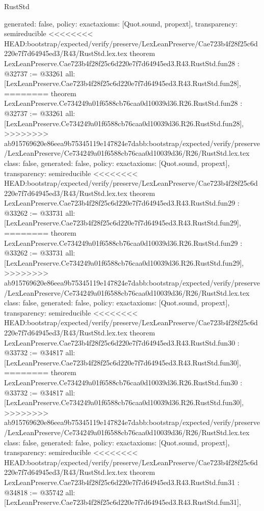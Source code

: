 \begin{lexlean}{RustStd}
\begin{coremodule}
{\begin{coremodule}
{{{{{{{{{{{{{{{{{{{{{{{{{{{{{{{  generated: false,
  policy: exact{axioms: [Quot.sound, propext]},
  transparency: semireducible
}
<<<<<<<< HEAD:bootstrap/expected/verify/preserve/LexLeanPreserve/Cae723b4f28f25c6d220e7f7d64945ed3/R43/RustStd.lex.tex
theorem LexLeanPreserve.Cae723b4f28f25c6d220e7f7d64945ed3.R43.RustStd.fun28 : @32737 := @33261 {
  all: [LexLeanPreserve.Cae723b4f28f25c6d220e7f7d64945ed3.R43.RustStd.fun28],
========
theorem LexLeanPreserve.Ce734249a01f6588cb76caa0d10039d36.R26.RustStd.fun28 : @32737 := @33261 {
  all: [LexLeanPreserve.Ce734249a01f6588cb76caa0d10039d36.R26.RustStd.fun28],
>>>>>>>> ab915769620e86eea9b75345119e147824e7dabb:bootstrap/expected/verify/preserve/LexLeanPreserve/Ce734249a01f6588cb76caa0d10039d36/R26/RustStd.lex.tex
  class: false,
  generated: false,
  policy: exact{axioms: [Quot.sound, propext]},
  transparency: semireducible
}
<<<<<<<< HEAD:bootstrap/expected/verify/preserve/LexLeanPreserve/Cae723b4f28f25c6d220e7f7d64945ed3/R43/RustStd.lex.tex
theorem LexLeanPreserve.Cae723b4f28f25c6d220e7f7d64945ed3.R43.RustStd.fun29 : @33262 := @33731 {
  all: [LexLeanPreserve.Cae723b4f28f25c6d220e7f7d64945ed3.R43.RustStd.fun29],
========
theorem LexLeanPreserve.Ce734249a01f6588cb76caa0d10039d36.R26.RustStd.fun29 : @33262 := @33731 {
  all: [LexLeanPreserve.Ce734249a01f6588cb76caa0d10039d36.R26.RustStd.fun29],
>>>>>>>> ab915769620e86eea9b75345119e147824e7dabb:bootstrap/expected/verify/preserve/LexLeanPreserve/Ce734249a01f6588cb76caa0d10039d36/R26/RustStd.lex.tex
  class: false,
  generated: false,
  policy: exact{axioms: [Quot.sound, propext]},
  transparency: semireducible
}
<<<<<<<< HEAD:bootstrap/expected/verify/preserve/LexLeanPreserve/Cae723b4f28f25c6d220e7f7d64945ed3/R43/RustStd.lex.tex
theorem LexLeanPreserve.Cae723b4f28f25c6d220e7f7d64945ed3.R43.RustStd.fun30 : @33732 := @34817 {
  all: [LexLeanPreserve.Cae723b4f28f25c6d220e7f7d64945ed3.R43.RustStd.fun30],
========
theorem LexLeanPreserve.Ce734249a01f6588cb76caa0d10039d36.R26.RustStd.fun30 : @33732 := @34817 {
  all: [LexLeanPreserve.Ce734249a01f6588cb76caa0d10039d36.R26.RustStd.fun30],
>>>>>>>> ab915769620e86eea9b75345119e147824e7dabb:bootstrap/expected/verify/preserve/LexLeanPreserve/Ce734249a01f6588cb76caa0d10039d36/R26/RustStd.lex.tex
  class: false,
  generated: false,
  policy: exact{axioms: [Quot.sound, propext]},
  transparency: semireducible
}
<<<<<<<< HEAD:bootstrap/expected/verify/preserve/LexLeanPreserve/Cae723b4f28f25c6d220e7f7d64945ed3/R43/RustStd.lex.tex
theorem LexLeanPreserve.Cae723b4f28f25c6d220e7f7d64945ed3.R43.RustStd.fun31 : @34818 := @35742 {
  all: [LexLeanPreserve.Cae723b4f28f25c6d220e7f7d64945ed3.R43.RustStd.fun31],
}}}}}}}}}}}}}}}}}}}}}}}}}}}}}}}}}}
\end{coremodule}}
\end{coremodule}
\end{lexlean}
